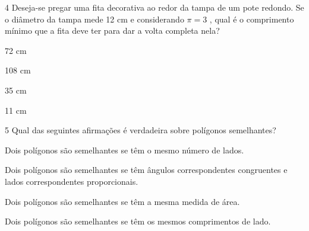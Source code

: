 


\pagebreak

\num{4} Deseja-se pregar uma fita decorativa ao redor da tampa de um pote
redondo. Se o diâmetro da tampa mede 12 cm e considerando $\pi = 3$ , qual é o comprimento mínimo
que a fita deve ter para dar a volta completa nela?


\begin{escolha}
\item 72 cm
\item 108 cm
\item 35 cm
\item 11 cm
\end{escolha}







\num{5} Qual das seguintes afirmações é verdadeira sobre polígonos
semelhantes?

\begin{escolha}
\item Dois polígonos são semelhantes se têm o mesmo número de lados.
\item Dois polígonos são semelhantes se têm ângulos correspondentes
congruentes e lados correspondentes proporcionais.
\item Dois polígonos são semelhantes se têm a mesma medida de área.
\item Dois polígonos são semelhantes se têm os mesmos comprimentos de lado.
\end{escolha}

